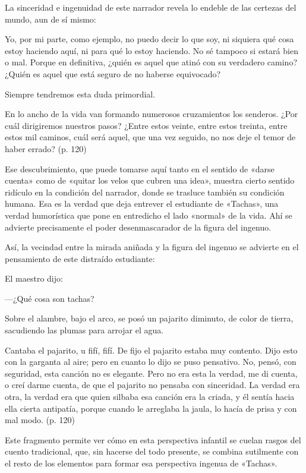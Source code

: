 \documentclass[14pt,twoside,final]{extbook} %
\begin{document}
La sinceridad e ingenuidad de este narrador revela lo endeble de las certezas del mundo, aun de sí mismo:
\begin{quoting}
Yo, por mi parte, como ejemplo, no puedo decir lo que soy, ni siquiera qué cosa estoy haciendo aquí, ni para qué lo estoy haciendo. No sé tampoco si estará bien o mal. Porque en definitiva, ¿quién es aquel que atinó con su verdadero camino? ¿Quién es aquel que está seguro de no haberse equivocado?

Siempre tendremos esta duda primordial.

En lo ancho de la vida van formando numerosos cruzamientos los senderos. ¿Por cuál dirigiremos nuestros pasos? ¿Entre estos veinte, entre estos treinta, entre estos mil caminos, cuál será aquel, que una vez seguido, no nos deje el temor de haber errado? (p. 120)
\end{quoting}
Ese descubrimiento, que puede tomarse aquí tanto en el sentido de «darse cuenta» como de «quitar los velos que cubren una idea», muestra cierto sentido ridículo en la condición del narrador, donde se trasluce también su condición humana. Esa es la verdad que deja entrever el estudiante de «Tachas», una verdad humorística que pone en entredicho el lado «normal» de la vida. Ahí se advierte precisamente el poder desenmascarador de la figura del ingenuo.

Así, la vecindad entre la mirada aniñada y la figura del ingenuo se advierte en el pensamiento de este distraído estudiante:
\begin{quoting}
El maestro dijo:

---¿Qué cosa son tachas?

Sobre el alambre, bajo el arco, se posó un pajarito diminuto, de color de tierra, sacudiendo las plumas para arrojar el agua.

Cantaba el pajarito, u fifí, fifí. De fijo el pajarito estaba muy contento. Dijo esto con la garganta al aire; pero en cuanto lo dijo se puso pensativo. No, pensó, con seguridad, esta canción no es elegante. Pero no era esta la verdad, me di cuenta, o creí darme cuenta, de que el pajarito no pensaba con sinceridad. La verdad era otra, la verdad era que quien silbaba esa canción era la criada, y él sentía hacia ella cierta antipatía, porque cuando le arreglaba la jaula, lo hacía de prisa y con mal modo. (p. 120)
\end{quoting}
Este fragmento permite ver cómo en esta perspectiva infantil se cuelan rasgos del cuento tradicional, que, sin hacerse del todo presente, se combina sutilmente con el resto de los elementos para formar esa perspectiva ingenua de «Tachas».
\end{document}
